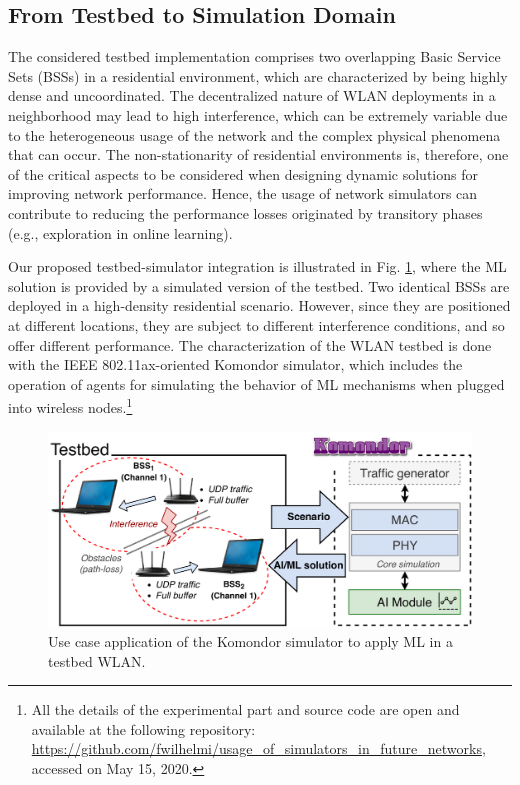 \documentclass[journal]{IEEEtran}
\begin{document}
	\subsection{From Testbed to Simulation Domain}
	The considered testbed implementation comprises two overlapping Basic Service Sets (BSSs) in a residential environment, which are characterized by being highly dense and uncoordinated. The decentralized nature of WLAN deployments in a neighborhood may lead to high interference, which can be extremely variable due to the heterogeneous usage of the network and the complex physical phenomena that can occur. The non-stationarity of residential environments is, therefore, one of the critical aspects to be considered when designing dynamic solutions for improving network performance. Hence, the usage of network simulators can contribute to reducing the performance losses originated by transitory phases (e.g., exploration in online learning). 

	Our proposed testbed-simulator integration is illustrated in Fig. \ref{fig:testbed}, where the ML solution is provided by a simulated version of the testbed. Two identical BSSs are deployed in a high-density residential scenario. However, since they are positioned at different locations, they are subject to different interference conditions, and so offer different performance. The characterization of the WLAN testbed is done with the IEEE 802.11ax-oriented Komondor simulator, which includes the operation of agents for simulating the behavior of ML mechanisms when plugged into wireless nodes.\footnote{All the details of the experimental part and source code are open and available at the following repository: \url{https://github.com/fwilhelmi/usage_of_simulators_in_future_networks}, accessed on May 15, 2020.}
		
	\begin{figure}[ht!]
		\centering
		\includegraphics[width=\columnwidth]{testbed2.pdf}
		\caption{Use case application of the Komondor simulator to apply ML in a testbed WLAN.}
		\label{fig:testbed}
	\end{figure}
\end{document}
